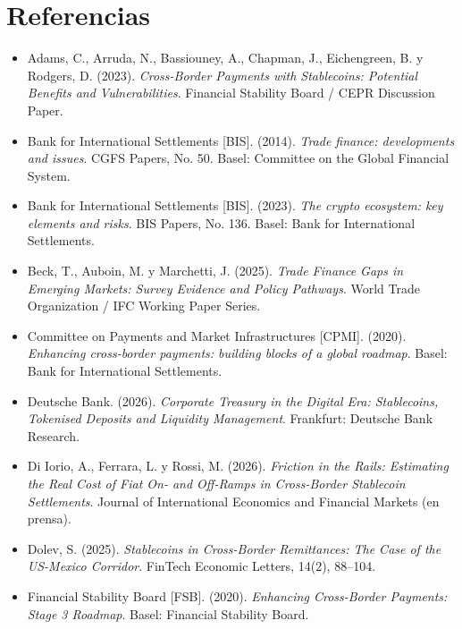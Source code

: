 \documentclass[spanish,11pt]{article}
\begin{document}
\section{Referencias}\label{referencias}

\begin{itemize}
  \setlength{\itemsep}{0pt}
  \item Adams, C., Arruda, N., Bassiouney, A., Chapman, J., Eichengreen, B. y Rodgers, D. (2023). \emph{Cross-Border Payments with Stablecoins: Potential Benefits and Vulnerabilities}. Financial Stability Board / CEPR Discussion Paper.

  \item Bank for International Settlements [BIS]. (2014). \emph{Trade finance: developments and issues}. CGFS Papers, No. 50. Basel: Committee on the Global Financial System.

  \item Bank for International Settlements [BIS]. (2023). \emph{The crypto ecosystem: key elements and risks}. BIS Papers, No. 136. Basel: Bank for International Settlements.

  \item Beck, T., Auboin, M. y Marchetti, J. (2025). \emph{Trade Finance Gaps in Emerging Markets: Survey Evidence and Policy Pathways}. World Trade Organization / IFC Working Paper Series.

  \item Committee on Payments and Market Infrastructures [CPMI]. (2020). \emph{Enhancing cross-border payments: building blocks of a global roadmap}. Basel: Bank for International Settlements.

  \item Deutsche Bank. (2026). \emph{Corporate Treasury in the Digital Era: Stablecoins, Tokenised Deposits and Liquidity Management}. Frankfurt: Deutsche Bank Research.

  \item Di Iorio, A., Ferrara, L. y Rossi, M. (2026). \emph{Friction in the Rails: Estimating the Real Cost of Fiat On- and Off-Ramps in Cross-Border Stablecoin Settlements}. Journal of International Economics and Financial Markets (en prensa).

  \item Dolev, S. (2025). \emph{Stablecoins in Cross-Border Remittances: The Case of the US-Mexico Corridor}. FinTech Economic Letters, 14(2), 88--104.

  \item Financial Stability Board [FSB]. (2020). \emph{Enhancing Cross-Border Payments: Stage 3 Roadmap}. Basel: Financial Stability Board.


\end{itemize}
\end{document}
